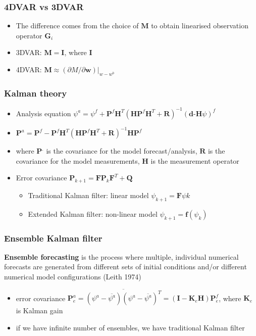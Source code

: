\documentclass{beamer}
\begin{document}
\begin{frame}
	\frametitle{4DVAR vs 3DVAR}
	\begin{itemize}
		\item The difference comes from the choice of $\mathbf{M}$ to obtain linearised observation operator $\mathbf {G}_{i}$
		\item 3DVAR: $\mathbf {M} = \mathbf {I}$, where $\mathbf {I}$
		\item 4DVAR: $\mathbf {M} \approx (\partial M/\partial \mathbf {w})|_{w-w^{b}}$
	\end{itemize}
\end{frame}


\begin{frame}
	\frametitle{Kalman theory}
	\begin{itemize}
		\item Analysis equation $\psi ^{a} = \psi ^{f} + \textbf{P} ^{f}\textbf{H} ^{T}(\textbf{HP} ^{f}\textbf{H} ^{T}+\textbf{R}) ^{-1}(\textbf{d-H}\psi) ^{f}$
		\item $\textbf{P}^{a} = \textbf{P}^{f} - \textbf{P}^{f}\textbf{H}^{T}(\textbf{HP}^{f}\textbf{H}^{T}+\textbf{R})^{-1}\textbf{HP}^{f} $ 
		\item where  $\textbf{P}^{.}$ is the covariance for the model forecast/analysis,  $\textbf{R}$ is the covariance for the model measurements, $\textbf{H}$ is the measurement operator
		
	    \item Error covariance $\textbf{P}_{k+1}=\textbf{F}\textbf{P}_{k}\textbf{F}^{T}+\textbf{Q}$
	    \begin{itemize}
	    	\item Traditional Kalman filter: linear model $\psi_{k+1}=\textbf{F}\psi{k}$
	    	\item Extended Kalman filter: non-linear model
	    	$\psi_{k+1}=\textbf{f}(\psi_{k})$
	    	
	    \end{itemize}
	\end{itemize}
\end{frame}


\begin{frame}
	\frametitle{Ensemble Kalman filter}
	
	\begin{definition}
		\textbf{Ensemble forecasting} is the process where multiple, individual numerical forecasts
		are generated from different sets of initial conditions
		and/or different numerical model configurations (Leith 1974)
	\end{definition}
	\begin{itemize}
		
		\item error covariance $\textbf{P}_{e}^{a} = \overline {(\psi^{a} - \overline{\psi^{a}})(\psi^{a} - \overline{\psi^{a}})^{T}} =  (\textbf{I}-\textbf{K}_{e}\textbf{H})\textbf{P}_{e}^{f}$, 
		where $\textbf{K}_{e}$ is Kalman gain
		\item if we have infinite number of ensembles, we have traditional Kalman filter

	\end{itemize}
\end{frame}
\end{document}
